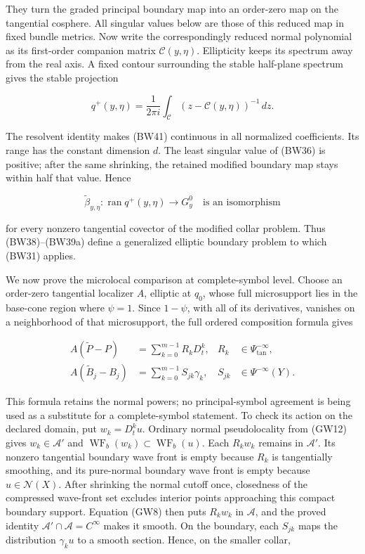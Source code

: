 \documentclass[
  11pt,
]{article}
\begin{document}
They turn the graded principal boundary map into an order-zero map on
the tangential cosphere. All singular values below are those of this
reduced map in fixed bundle metrics. Now write the correspondingly
reduced normal polynomial as its first-order companion matrix
\(\mathcal C(y,\eta)\). Ellipticity keeps its spectrum away from the
real axis. A fixed contour surrounding the stable half-plane spectrum
gives the stable projection

\[
 q^+(y,\eta)=\frac1{2\pi i}\int_{\mathscr C}
       (z-\mathcal C(y,\eta))^{-1}\,dz.
 \tag{BW41}
\]

The resolvent identity makes (BW41) continuous in all normalized
coefficients. Its range has the constant dimension \(d\). The least
singular value of (BW36) is positive; after the same shrinking, the
retained modified boundary map stays within half that value. Hence

\[
 \widetilde\beta_{y,\eta}:
 \operatorname{ran}q^+(y,\eta)\longrightarrow G^0_y
 \quad\text{is an isomorphism}
 \tag{BW42}
\]

for every nonzero tangential covector of the modified collar problem.
Thus (BW38)--(BW39a) define a generalized elliptic boundary problem to
which (BW31) applies.

We now prove the microlocal comparison at complete-symbol level. Choose
an order-zero tangential localizer \(A\), elliptic at \(q_0\), whose
full microsupport lies in the base-cone region where \(\psi=1\). Since
\(1-\psi\), with all of its derivatives, vanishes on a neighborhood of
that microsupport, the full ordered composition formula gives

\[
 \begin{aligned}
 A(\widetilde P-P)&=\sum_{k=0}^{m-1}R_kD_t^k,
        &R_k&\in\Psi_{\mathrm{tan}}^{-\infty},\\
 A(\widetilde B_j-B_j)&=\sum_{k=0}^{m-1}S_{jk}\gamma_k,
        &S_{jk}&\in\Psi^{-\infty}(Y).
 \end{aligned}
 \tag{BW43}
\]

This formula retains the normal powers; no principal-symbol agreement is
being used as a substitute for a complete-symbol statement. To check its
action on the declared domain, put \(w_k=D_t^ku\). Ordinary normal
pseudolocality from (GW12) gives \(w_k\in\mathcal A'\) and
\(\operatorname{WF}_b(w_k)\subset\operatorname{WF}_b(u)\). Each
\(R_kw_k\) remains in \(\mathcal A'\). Its nonzero tangential boundary
wave front is empty because \(R_k\) is tangentially smoothing, and its
pure-normal boundary wave front is empty because \(u\in\mathcal N(X)\).
After shrinking the normal cutoff once, closedness of the compressed
wave-front set excludes interior points approaching this compact
boundary support. Equation (GW8) then puts \(R_kw_k\) in \(\mathcal A\),
and the proved identity \(\mathcal A'\cap\mathcal A=C^\infty\) makes it
smooth. On the boundary, each \(S_{jk}\) maps the distribution
\(\gamma_ku\) to a smooth section. Hence, on the smaller collar,
\end{document}
